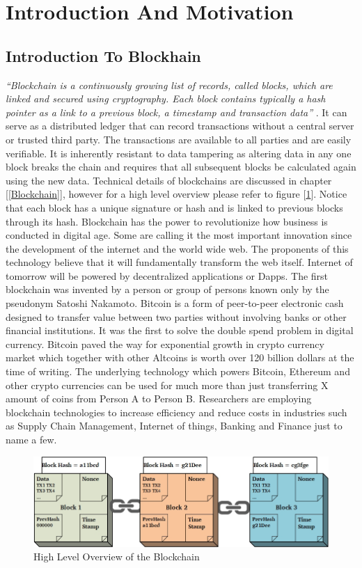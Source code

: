 \section{Introduction And Motivation}
\subsection{Introduction To Blockhain}
\textit{“Blockchain is a continuously growing list of records, called blocks, which are linked and secured using cryptography. Each block contains typically a hash pointer as a link to a previous block, a timestamp and transaction data”} \cite{wiki:001}. It can serve as a distributed ledger that can record transactions without a central server or trusted third party. The transactions are available to all parties and are easily verifiable. It is inherently resistant to data tampering as altering data in any one block breaks the chain and requires that all subsequent blocks be calculated again using the new data. Technical details of blockchains are discussed in chapter [\ref{Blockchain}], however for a high level overview please refer to figure [\ref{fig:blockchain}]. Notice that each block has a unique signature or hash and is linked to previous blocks through its hash. Blockchain has the power to revolutionize how business is conducted in digital age. Some are calling it the most important innovation since the development of the internet and the world wide web. The proponents of this technology believe that it will fundamentally transform the web itself. Internet of tomorrow will be powered by decentralized applications or Dapps. The first blockchain was invented by a person or group of persons known only by the pseudonym Satoshi Nakamoto. Bitcoin is a form of peer-to-peer electronic cash designed to transfer value between two parties without involving banks or other financial institutions. It was the first to solve the double spend problem in digital currency. Bitcoin paved the way for exponential growth in crypto currency market which together with other Altcoins is worth over 120 billion dollars at the time of writing. The underlying technology which powers Bitcoin, Ethereum and other crypto currencies can be used for much more than just transferring X amount of coins from Person A to Person B. Researchers are employing blockchain technologies to increase efficiency and reduce costs in industries such as Supply Chain Management, Internet of things, Banking and Finance just to name a few.

\begin{figure}[b]
	\centering
    \includegraphics[width=160mm,scale=0.5]{figs/blockchain}
	\caption{High Level Overview of the Blockchain}
	\label{fig:blockchain}
\end{figure}
\clearpage  

